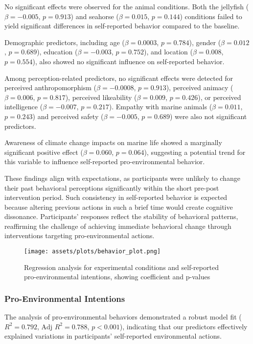\documentclass[sigconf, nonacm]{acmart}
\begin{document}
No significant effects were observed for the animal conditions. Both the jellyfish (\(\beta = -0.005\), \(p = 0.913\)) and seahorse (\(\beta = 0.015\), \(p = 0.144\)) conditions failed to yield significant differences in self-reported behavior compared to the baseline.

Demographic predictors, including age (\(\beta = 0.0003\), \(p = 0.784\)), gender (\(\beta = 0.012\), \(p = 0.689\)), education (\(\beta = -0.003\), \(p = 0.752\)), and location (\(\beta = 0.008\), \(p = 0.554\)), also showed no significant influence on self-reported behavior.

Among perception-related predictors, no significant effects were detected for perceived anthropomorphism (\(\beta = -0.0008\), \(p = 0.913\)), perceived animacy (\(\beta = 0.006\), \(p = 0.817\)), perceived likeability (\(\beta = 0.009\), \(p = 0.426\)), or perceived intelligence (\(\beta = -0.007\), \(p = 0.217\)). Empathy with marine animals (\(\beta = 0.011\), \(p = 0.243\)) and perceived safety (\(\beta = -0.005\), \(p = 0.689\)) were also not significant predictors.

Awareness of climate change impacts on marine life showed a marginally significant positive effect (\(\beta = 0.060\), \(p = 0.064\)), suggesting a potential trend for this variable to influence self-reported pro-environmental behavior.

These findings align with expectations, as participants were unlikely to change their past behavioral perceptions significantly within the short pre-post intervention period. Such consistency in self-reported behavior is expected because altering previous actions in such a brief time would create cognitive dissonance. Participants’ responses reflect the stability of behavioral patterns, reaffirming the challenge of achieving immediate behavioral change through interventions targeting pro-environmental actions.
\begin{figure}
    \centering
    \texttt{[image: assets/plots/behavior\_plot.png]}
    \caption{Regression analysis for experimental conditions and self-reported pro-environmental intentions, showing coefficient and p-values}
    \label{fig:behavior_post}
\end{figure}

\subsubsection{Pro-Environmental Intentions}

The analysis of pro-environmental behaviors demonstrated a robust model fit ($R^2 = 0.792$, $\text{Adj } R^2 = 0.788$, $p < 0.001$), indicating that our predictors effectively explained variations in participants' self-reported environmental actions.
\end{document}
